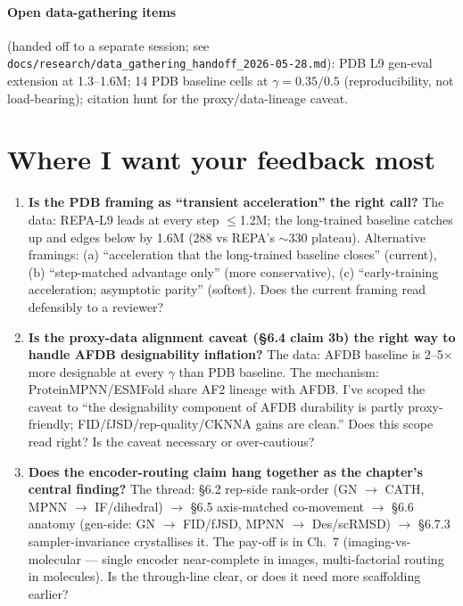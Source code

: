 \documentclass[11pt,a4paper]{article}
\begin{document}
\paragraph{Open data-gathering items} (handed off to a separate session;
see \texttt{docs/research/data\_gathering\_handoff\_2026-05-28.md}):
PDB L9 gen-eval extension at 1.3--1.6M; 14 PDB baseline cells at
$\gamma{=}0.35/0.5$ (reproducibility, not load-bearing); citation hunt
for the proxy/data-lineage caveat.

\section{Where I want your feedback most}

\begin{enumerate}[leftmargin=*,itemsep=2pt]
\item \textbf{Is the PDB framing as ``transient acceleration'' the right
call?} The data: REPA-L9 leads at every step $\le$1.2M; the long-trained
baseline catches up and edges below by 1.6M (288 vs REPA's $\sim$330
plateau). Alternative framings: (a) ``acceleration that the long-trained
baseline closes'' (current), (b) ``step-matched advantage only'' (more
conservative), (c) ``early-training acceleration; asymptotic parity''
(softest). Does the current framing read defensibly to a reviewer?

\item \textbf{Is the proxy-data alignment caveat (\S6.4 claim 3b) the
right way to handle AFDB designability inflation?} The data: AFDB
baseline is 2--5$\times$ more designable at every $\gamma$ than PDB
baseline. The mechanism: ProteinMPNN/ESMFold share AF2 lineage with
AFDB. I've scoped the caveat to ``the designability component of AFDB
durability is partly proxy-friendly; FID/fJSD/rep-quality/CKNNA gains
are clean.'' Does this scope read right? Is the caveat necessary or
over-cautious?

\item \textbf{Does the encoder-routing claim hang together as the
chapter's central finding?} The thread: \S6.2 rep-side rank-order
(GN $\to$ CATH, MPNN $\to$ IF/dihedral) $\to$ \S6.5 axis-matched
co-movement $\to$ \S6.6 anatomy (gen-side: GN $\to$ FID/fJSD,
MPNN $\to$ Des/scRMSD) $\to$ \S6.7.3 sampler-invariance crystallises it.
The pay-off is in Ch.~7 (imaging-vs-molecular --- single encoder
near-complete in images, multi-factorial routing in molecules). Is
the through-line clear, or does it need more scaffolding earlier?


\end{enumerate}
\end{document}
